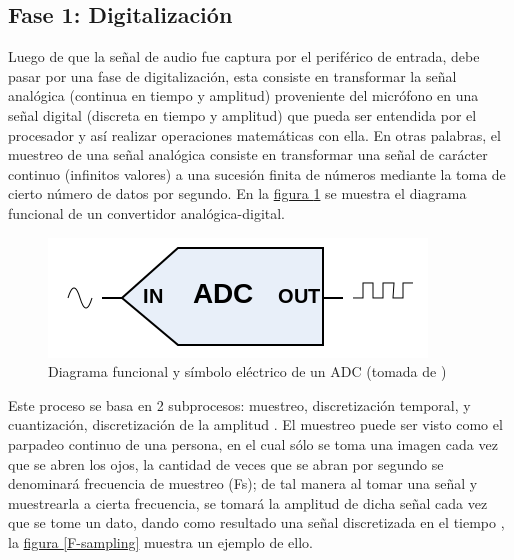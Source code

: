 \documentclass[11pt,lettersize]{article} %
\newcommand{\figura}[1]{\hyperref[{#1}]{figura \ref*{#1}}}
\begin{document}
\subsection{Fase 1: Digitalización}
Luego de que la señal de audio fue captura por el periférico de entrada, debe pasar por una fase de digitalización, esta consiste en transformar la señal analógica (continua en tiempo y amplitud) proveniente del micrófono en una señal digital (discreta en tiempo y amplitud) que pueda ser entendida por el procesador y así realizar operaciones matemáticas con ella. En otras palabras, el muestreo de una señal analógica consiste en transformar una señal de carácter continuo (infinitos valores) a una sucesión finita de números mediante la toma de cierto número de datos por segundo. En la \figura{F-diagrama-adc} se muestra el diagrama funcional de un convertidor analógica-digital.\\

\begin{figure}[H]
	\centering
	\includegraphics[width=.5\textwidth]{images/diagrama-adc.png}
	\caption[Diagrama funcional y símbolo eléctrico de un ADC]{Diagrama funcional y símbolo eléctrico de un ADC (tomada de \cite{WikiADC})}
	\label{F-diagrama-adc}
\end{figure}

Este proceso se basa en 2 subprocesos: muestreo, discretización temporal, y cuantización, discretización de la amplitud \cite{Proakis1996}. El muestreo puede ser visto como el parpadeo continuo de una persona, en el cual sólo se toma una imagen cada vez que se abren los ojos, la cantidad de veces que se abran por segundo se denominará frecuencia de muestreo (Fs); de tal manera al tomar una señal y muestrearla a cierta frecuencia, se tomará la amplitud de dicha señal cada vez que se tome un dato, dando como resultado una señal discretizada en el tiempo \cite{Prandoni2008}, la \figura{F-sampling} muestra un ejemplo de ello. \\
\end{document}
